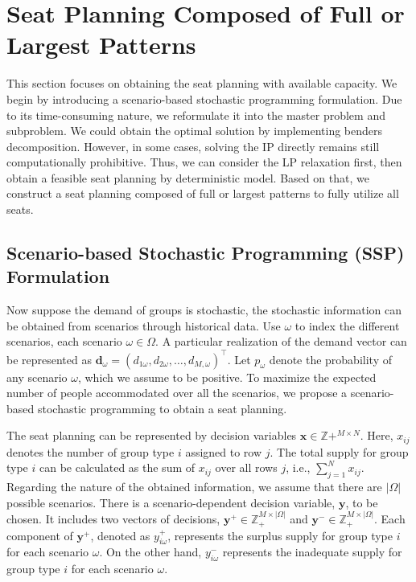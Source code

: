
\section{Seat Planning Composed of Full or Largest Patterns}
This section focuses on obtaining the seat planning with available capacity. We begin by introducing a scenario-based stochastic programming formulation. Due to its time-consuming nature, we reformulate it into the master problem and subproblem. We could obtain the optimal solution by implementing benders decomposition. However, in some cases, solving the IP directly remains still computationally prohibitive. Thus, we can consider the LP relaxation first, then obtain a feasible seat planning by deterministic model. Based on that, we construct a seat planning composed of full or largest patterns to fully utilize all seats.


\subsection{Scenario-based Stochastic Programming (SSP) Formulation}
Now suppose the demand of groups is stochastic, the stochastic information can be obtained from scenarios through historical data. Use $\omega$ to index the different scenarios, each scenario $\omega \in \Omega$. A particular realization of the demand vector can be represented as $\mathbf{d}_\omega = (d_{1\omega},d_{2\omega},\ldots,d_{M,\omega})^{\intercal}$. Let $p_{\omega}$ denote the probability of any scenario $\omega$, which we assume to be positive. To maximize the expected number of people accommodated over all the scenarios, we propose a scenario-based stochastic programming to obtain a seat planning.

The seat planning can be represented by decision variables $\mathbf{x} \in \mathbb{Z}{+}^{M \times N}$. Here, $x_{ij}$ denotes the number of group type $i$ assigned to row $j$. The total supply for group type $i$ can be calculated as the sum of $x_{ij}$ over all rows $j$, i.e., $\sum_{j=1}^N x_{ij}$. Regarding the nature of the obtained information, we assume that there are $|\Omega|$ possible scenarios. There is a scenario-dependent decision variable, $\mathbf{y}$, to be chosen. It includes two vectors of decisions, $\mathbf{y}^{+} \in \mathbb{Z}_{+}^{M \times |\Omega|}$ and $\mathbf{y}^{-} \in \mathbb{Z}_{+}^{M \times |\Omega|}$. Each component of $\mathbf{y}^{+}$, denoted as $y_{i\omega}^{+}$, represents the surplus supply for group type $i$ for each scenario $\omega$. On the other hand, $y_{i\omega}^{-}$ represents the inadequate supply for group type $i$ for each scenario $\omega$.



